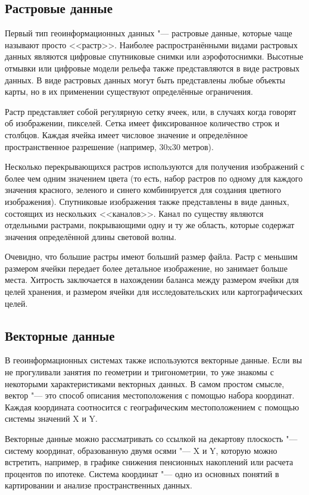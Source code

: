 \subsection{Растровые данные}\label{label_rasterdata}

Первый тип геоинформационных данных "--- растровые данные, которые чаще называют
просто <<растр>>. Наиболее распространёнными видами растровых данных являются
цифровые спутниковые снимки или аэрофотоснимки. Высотные отмывки или цифровые
модели рельефа также представляются в виде растровых данных. В виде растровых
данных могут быть представлены любые объекты карты, но в их применении
существуют определённые ограничения.

Растр представляет собой регулярную сетку ячеек, или, в случаях когда
говорят об изображении, пикселей. Сетка имеет фиксированное количество
строк и столбцов. Каждая ячейка имеет числовое значение и определённое
пространственное разрешение (например, 30x30 метров).

Несколько перекрывающихся растров используются для получения изображений
с более чем одним значением цвета (то есть, набор растров по одному для каждого
значения красного, зеленого и синего комбинируется для создания
цветного изображения). Спутниковые изображения также представлены в виде данных,
состоящих из нескольких <<каналов>>. Канал по существу являются отдельными растрами,
покрывающими одну и ту же область, которые содержат значения определённой
длины световой волны.

Очевидно, что большие растры имеют больший размер файла. Растр с меньшим
размером ячейки передает более детальное изображение, но занимает больше места.
Хитрость заключается в нахождении баланса между размером ячейки для целей
хранения, и размером ячейки для исследовательских или картографических целей.

\subsection{Векторные данные}\label{label_vectordata}

В геоинформационных системах также используются векторные данные. Если
вы не прогуливали занятия по геометрии и тригонометрии, то уже знакомы
с некоторыми характеристиками векторных данных. В самом простом смысле,
вектор "--- это способ описания местоположения с помощью набора координат.
Каждая координата соотносится с географическим местоположением с помощью
системы значений X и Y.

Векторные данные можно рассматривать со ссылкой на декартову плоскость "---
систему координат, образованную двумя осями "--- X и Y, которую можно встретить,
например, в графике снижения пенсионных накоплений или расчета процентов по ипотеке.
Система координат "--- одно из основных понятий в картировании и анализе пространственных
данных.

